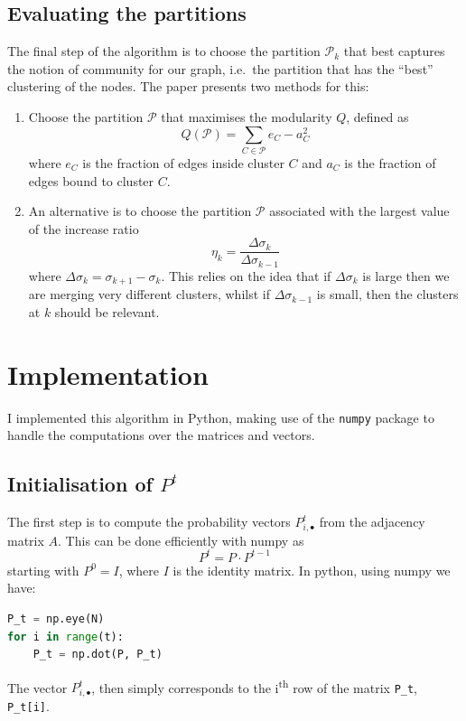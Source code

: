 \documentclass[12pt]{article}
\theoremstyle{definition}
\begin{document}
\subsection{Evaluating the partitions}
The final step of the algorithm is to choose the partition $\mathcal{P}_k$ that best captures the notion of community for our graph, i.e.\ the partition that has the ``best'' clustering of the nodes. The paper presents two methods for this:
\begin{enumerate}
	\item Choose the partition $\mathcal{P}$ that maximises the modularity $Q$, defined as
	\[ Q(\mathcal{P}) = \sum	_{C \in \mathcal{P}} e_C - a_C^2\] 
	where $e_C$ is the fraction of edges inside cluster $C$ and $a_C$ is the fraction of edges bound to cluster $C$.
	\item An alternative is to choose the partition $\mathcal{P}$ associated with the largest value of the increase ratio
	\[ \eta_k = \frac{\Delta\sigma_k}{\Delta\sigma_{k-1}}\]
	where $\Delta\sigma_k = \sigma_{k+1} - \sigma_k$.
	This relies on the idea that if $\Delta\sigma_k$ is large then we are merging  very different clusters, whilst if $\Delta\sigma_{k-1}$ is small, then the clusters at $k$ should be relevant.
\end{enumerate}


\section{Implementation}
I implemented this algorithm in Python, making use of the \texttt{numpy} package to handle the computations over the matrices and vectors.

\subsection{Initialisation of $P^t$}
The first step is to compute the probability vectors $P_{i,\bullet}^t$ from the adjacency matrix $A$. This can be done efficiently with numpy as 
\[ P^t = P \cdot P^{t-1} \]
starting with $P^0=I$, where $I$ is the identity matrix. In python, using numpy we have:
\begin{lstlisting}[language=Python]
P_t = np.eye(N)
for i in range(t):
    P_t = np.dot(P, P_t)
\end{lstlisting}
The vector $P_{i,\bullet}^t$, then simply corresponds to the i\textsuperscript{th} row of the matrix \texttt{P\_t}, \texttt{P\_t[i]}.
\end{document}
